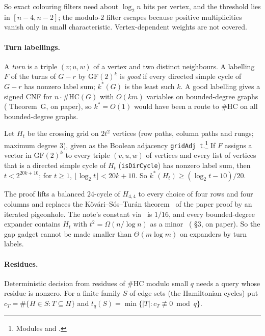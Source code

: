 \documentclass[10pt]{amsart}
\theoremstyle{plain}
\theoremstyle{definition}
\theoremstyle{remark}
\numberwithin{equation}{section}
\begin{document}
\noindent So exact colouring filters need about $\log_2n$ bits per vertex, and the threshold lies in
$[n-4,n-2]$; the modulo-$2$ filter escapes because positive multiplicities vanish only in small
characteristic. Vertex-dependent weights are not covered.

\paragraph{Turn labellings.} A \emph{turn} is a triple $(v;u,w)$ of a vertex and two distinct
neighbours. A labelling $F$ of the turns of $G-r$ by $\mathrm{GF}(2)^k$ is \emph{good} if every directed
simple cycle of $G-r$ has nonzero label sum; $k^*(G)$ is the least such $k$. A good labelling gives a
signed CNF for $n\cdot\#\mathrm{HC}(G)$ with $O(km)$ variables on bounded-degree graphs
( Theorem~G, on paper), so $k^*=O(1)$ would have been a route to
$\#$HC on all bounded-degree graphs.

\begin{theorem}\label{thm:kstar}
Let $H_t$ be the crossing grid on $2t^2$ vertices (row paths, column paths and rungs; maximum degree
$3$), given as the Boolean adjacency \texttt{gridAdj t}.\footnote{Modules
 and .} If
$F$ assigns a vector in $\mathrm{GF}(2)^k$ to every triple $(v,u,w)$ of vertices and every list of vertices that is a directed
simple cycle of $H_t$ (\texttt{isDirCycle}) has nonzero label sum, then $t<2^{20k+10}$; for $t\ge1$,
$\lfloor\log_2t\rfloor<20k+10$. So $k^*(H_t)\ge(\log_2t-10)/20$.
\end{theorem}

\noindent The proof lifts a balanced $24$-cycle of $H_{4,4}$ to every choice of four rows and four
columns and replaces the K\H{o}v\'ari--S\'os--Tur\'an theorem~\cite{KST54} of the paper proof by an iterated
pigeonhole. The note's constant via~\cite{KST54} is $1/16$, and every bounded-degree expander contains
$H_t$ with $t^2=\Omega(n/\log n)$ as a minor~\cite{ChuzhoyNimavat19} ( \S3, on paper).
So the gap gadget cannot be made smaller than $\Theta(m\log m)$ on expanders by turn labels.

\paragraph{Residues.} Deterministic decision from residues of $\#$HC modulo small $q$ needs a query
whose residue is nonzero. For a finite family $S$ of edge sets (the Hamiltonian cycles) put
$c_T=\#\{H\in S:T\subseteq H\}$ and $t_q(S)=\min\{|T|:c_T\not\equiv0\bmod q\}$.
\end{document}
